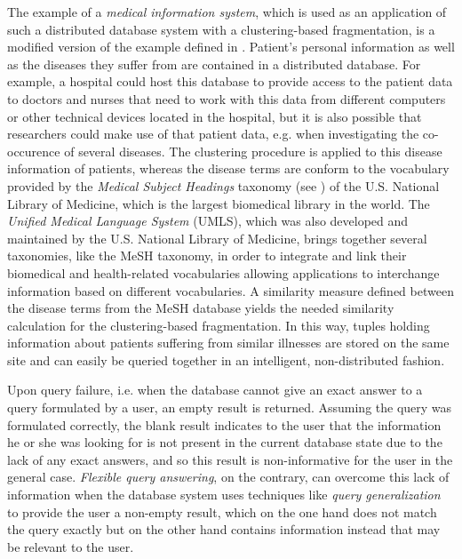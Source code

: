 The example of a \emph{medical information system}, which is used as an application of such a distributed database system with a clustering-based 
fragmentation, is a modified version of the example defined in \citet{Wiese2014}. Patient's personal information as well as the diseases they suffer from are 
contained in a distributed database. For example, a hospital could host this database to provide access to the patient data to doctors and nurses that need to
work with this data from different computers or other technical devices located in the hospital, but it is also possible that researchers could make use of that 
patient data, e.g. when investigating the co-occurence of several diseases.
The clustering procedure is applied to this disease information of patients, whereas the disease terms are conform to the vocabulary provided by the 
\emph{Medical Subject Headings} taxonomy (see ) of the U.S. National Library of Medicine, which is the largest biomedical library in the world. 
The \emph{Unified Medical Language System} (UMLS), which was also developed and maintained by the U.S. National Library of Medicine, brings together several 
taxonomies, like the MeSH taxonomy, in order to integrate and link their biomedical and health-related vocabularies allowing applications to interchange
information based on different vocabularies.
A similarity measure defined between the disease terms from the MeSH database yields the needed similarity calculation for the clustering-based fragmentation.
In this way, tuples holding information about patients suffering from similar illnesses are stored on the same site and can easily be queried together in an
intelligent, non-distributed fashion.


Upon query failure, i.e. when the database cannot give an exact answer to a query formulated by a user, an empty result is returned. Assuming the query was 
formulated correctly, the blank result indicates to the user that the information he or she was looking for is not present in the current database state due to
the lack of any exact answers, and so this result is non-informative for the user in the general case. \emph{Flexible query answering}, on the contrary, can 
overcome this lack of information when the database system uses techniques like \emph{query generalization} to provide the user a non-empty result, which on 
the one hand does not match the query exactly but on the other hand contains information instead that may be relevant to the user. 

